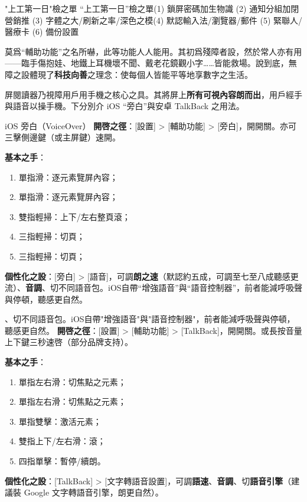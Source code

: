 \begin{tcbinfo}{"上工第一日"檢之單}
“上工第一日”檢之單\newline (1) 鎖屏密碼加生物識 (2) 通知分組加閉營銷推 (3) 字體之大/刷新之率/深色之模\newline (4) 默認輸入法/瀏覽器/郵件 (5) 緊聯人/醫療卡 (6) 備份設置

\end{tcbinfo}


莫爲“輔助功能”之名所嚇，此等功能人人能用。其初爲殘障者設，然於常人亦有用——臨手傷抱娃、地鐵上耳機壞不聞、戴老花鏡觀小字……皆能救場。說到底，無障之設體現了\textbf{科技向善}之理念：使每個人皆能平等地享數字之生活。


屏閱讀器乃視障用戶用手機之核心之具。其將屏上\textbf{所有可視內容朗而出}，用戶經手與語音以操手機。下分別介 iOS “旁白”與安卓 TalkBack 之用法。

\begin{tcbinfo}{iOS 旁白（VoiceOver）}
\textbf{開啓之徑}：[設置] > [輔助功能] > [旁白]，開開關。亦可三擊側邊鍵（或主屏鍵）速開。

\textbf{基本之手}：

\begin{enumerate}
  \item 單指滑：逐元素覽屏內容；
  \item 單指滑：逐元素覽屏內容；
  \item 雙指輕掃：上下/左右整頁滾；
  \item 三指輕掃：切頁；
  \item 三指輕掃：切頁；
\end{enumerate}

\textbf{個性化之設}：[旁白] > [語音]，可調\textbf{朗之速}（默認約五成，可調至七至八成聽感更流）、\textbf{音調}、切不同語音包。iOS自帶“增強語音”與“語音控制器”，前者能減呼吸聲與停頓，聽感更自然。

\end{tcbinfo}

\begin{tcbinfo}{、切不同語音包。iOS自帶"增強語音"與"語音控制器"，前者能減呼吸聲與停頓，聽感更自然。}
\textbf{開啓之徑}：[設置] > [輔助功能] > [TalkBack]，開開關。或長按音量上下鍵三秒速啓（部分品牌支持）。

\textbf{基本之手}：

\begin{enumerate}
  \item 單指左右滑：切焦點之元素；
  \item 單指左右滑：切焦點之元素；
  \item 單指雙擊：激活元素；
  \item 雙指上下/左右滑：滾；
  \item 四指單擊：暫停/續朗。
\end{enumerate}

\textbf{個性化之設}：[TalkBack] > [文字轉語音設置]，可調\textbf{語速}、\textbf{音調}、切\textbf{語音引擎}（建議裝 Google 文字轉語音引擎，朗更自然）。

\end{tcbinfo}

